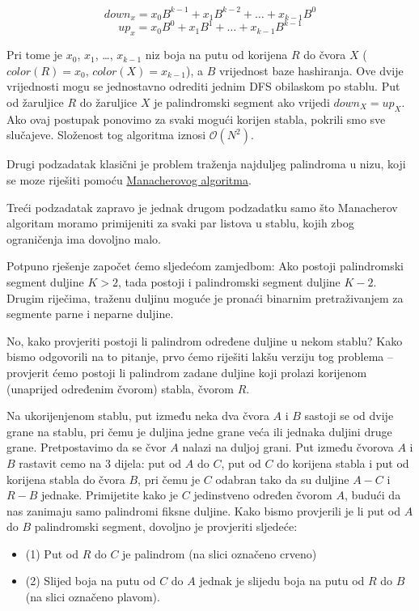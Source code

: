 \documentclass[a4paper]{article}
\begin{document}
\[down_x = x_0B^{k-1} + x_1B^{k-2} + \dots + x_{k-1}B^0\]
\[up_x = x_0B^0 + x_1B^1 + \dots + x_{k-1}B^{k-1}\]

Pri tome je $x_0$, $x_1$, \dots, $x_{k-1}$ niz boja na putu od korijena $R$ do
čvora $X$ ($color(R) = x_0$, $color(X) = x_{k-1}$), a $B$ vrijednost baze
hashiranja. Ove dvije vrijednosti mogu se jednostavno odrediti jednim DFS
obilaskom po stablu. Put od žaruljice $R$ do žaruljice $X$ je palindromski
segment ako vrijedi $down_X = up_X$.  Ako ovaj postupak ponovimo za svaki
mogući korijen stabla, pokrili smo sve slučajeve. Složenost tog algoritma
iznosi $\mathcal{O}(N^2)$.

Drugi podzadatak klasični je problem traženja najduljeg palindroma u nizu, koji
se moze riješiti pomoću
\href{https://en.wikipedia.org/wiki/Longest_palindromic_substring}{Manacherovog
algoritma}.

Treći podzadatak zapravo je jednak drugom podzadatku samo što Manacherov algoritam
moramo primijeniti za svaki par listova u stablu, kojih zbog ograničenja ima
dovoljno malo.

Potpuno rješenje započet ćemo sljedećom zamjedbom: Ako postoji palindromski
segment duljine $K > 2$, tada postoji i palindromski segment duljine $K - 2$.
Drugim riječima, traženu duljinu moguće je pronaći binarnim pretraživanjem za
segmente parne i neparne duljine.

No, kako provjeriti postoji li palindrom određene duljine u nekom stablu? Kako
bismo odgovorili na to pitanje, prvo ćemo riješiti lakšu verziju tog problema --
provjerit ćemo postoji li palindrom zadane duljine koji prolazi korijenom
(unaprijed određenim čvorom) stabla, čvorom $R$.

Na ukorijenjenom stablu, put između neka dva čvora $A$ i $B$ sastoji se od
dvije grane na stablu, pri čemu je duljina jedne grane veća ili jednaka duljini
druge grane. Pretpostavimo da se čvor $A$ nalazi na duljoj grani. Put između
čvorova $A$ i $B$ rastavit cemo na $3$ dijela: put od $A$ do $C$, put od $C$ do
korijena stabla i put od korijena stabla do čvora $B$, pri čemu je $C$ odabran
tako da su duljine $A-C$ i $R-B$ jednake. Primijetite kako je $C$ jedinstveno
određen čvorom $A$, budući da nas zanimaju samo palindromi fiksne duljine. Kako
bismo provjerili je li put od $A$ do $B$ palindromski segment, dovoljno je
provjeriti sljedeće:

\begin{itemize}
  \item (1) Put od $R$ do $C$ je palindrom (na slici označeno crveno)
  \item (2) Slijed boja na putu od $C$ do $A$ jednak je slijedu boja na putu od $R$
    do $B$ (na slici označeno plavom).
\end{itemize}
\end{document}
